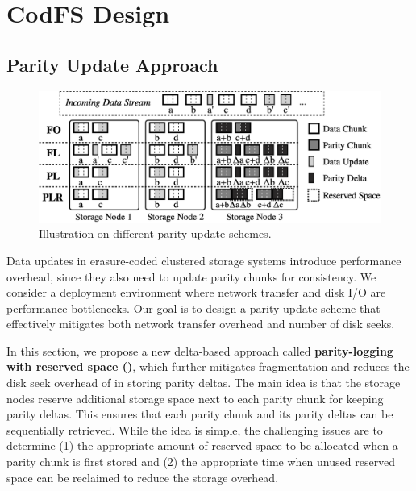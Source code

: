 \chapter{CodFS Design}
\label{chap:codfs}

\section{Parity Update Approach}
\label{sec:parity}

\begin{figure}[!t]
    \centering
    \includegraphics[width=4.8in]{figs/schemes_chunkflow}
    \vspace{-3pt}
    \caption{Illustration on different parity update schemes.}
    \label{fig:schemes_chunkflow}
\end{figure}

Data updates in erasure-coded clustered storage systems introduce performance
overhead, since they also need to update parity chunks for consistency.  We
consider a deployment environment where network transfer and disk I/O are
performance bottlenecks.  Our goal is to design a parity update scheme that
effectively mitigates both network transfer overhead and number of disk seeks.

In this section, we propose a new delta-based approach called {\bf parity-logging with reserved
space (\PLR)}, which further mitigates fragmentation and reduces the disk seek
overhead of \PL in storing parity deltas.  The main idea is that the storage
nodes reserve additional storage space next to each parity chunk for keeping 
parity deltas.  This ensures that each parity chunk and its parity deltas
can be sequentially retrieved. While the idea is simple, the challenging
issues are to determine (1) the appropriate amount of reserved space to be
allocated when a parity chunk is first stored and (2) the appropriate time
when unused reserved space can be reclaimed to reduce the storage overhead. 


